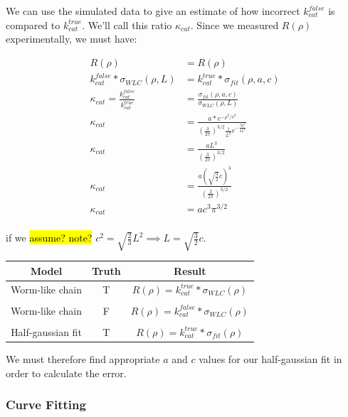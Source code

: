 \documentclass[../../AdvancementSummary.tex]{subfiles}
\begin{document}
We can use the simulated data to give an estimate of how incorrect $k^{false}_{cat}$ is compared to $k^{true}_{cat}$. We'll call this ratio $\kappa_{cat}$. Since we measured $R(\rho)$ experimentally, we must have:


\begin{align*}
R(\rho) &= R(\rho) \\
k^{false}_{cat}*\sigma_{WLC}(\rho, L) &= k^{true}_{cat}*\sigma_{fit}(\rho, a, c) \\
\kappa_{cat} = \frac{k^{false}_{cat}}{k^{true}_{cat}} &= \frac{\sigma_{fit}(\rho, a, c)}{\sigma_{WLC}(\rho, L)} \\
\kappa_{cat} &= \frac{a*e^{-\rho^2/c^2}}{\left(\frac{3}{2\pi}\right)^{3/2} \frac{1}{L^3}e^{-\frac{3\rho^2}{2L^2}}} \\
\kappa_{cat} &= \frac{aL^3}{\left(\frac{3}{2\pi}\right)^{3/2}} \\
\kappa_{cat} &= \frac{a\left(\sqrt{\frac{3}{2}}c\right)^3}{\left(\frac{3}{2\pi}\right)^{3/2} } \\
\kappa_{cat} &= ac^3\pi^{3/2}\\
\end{align*}

if we \hl{assume? note?} $c^2 = \sqrt{\frac{2}{3}}L^2 \implies L = \sqrt{\frac{3}{2}}c$.

\begin{center}
\begin{tabular}{| c | c | c |}
	\hline
		Model & Truth & Result \\ 
		\hline 
		Worm-like chain 	& 	T 	& 	$R(\rho) = k^{true}_{cat}*\sigma_{WLC}(\rho)$	 \\
		& & \\
		Worm-like chain 	& 	F 	& 	$R(\rho) = k^{false}_{cat}*\sigma_{WLC}(\rho)$	 \\ 
		& & \\
		Half-gaussian fit 	& 	T 	& 	$R(\rho) = k^{true}_{cat}*\sigma_{fit}(\rho)$	 \\
	\hline
\end{tabular}
\end{center}


We must therefore find appropriate $a$ and $c$ values for our half-gaussian fit in order to calculate the error.

\subsubsection{Curve Fitting}
\end{document}
